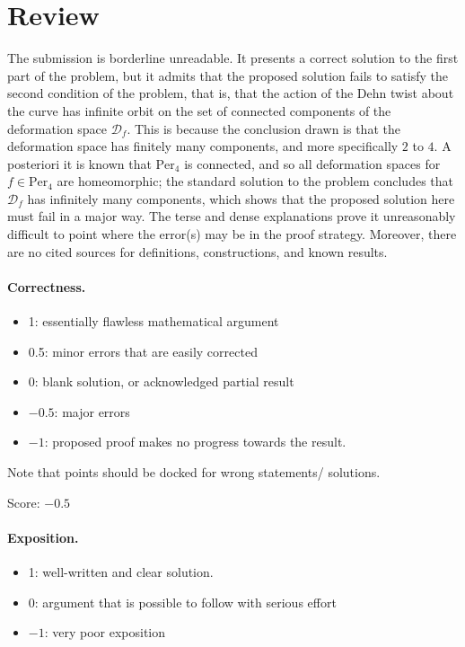 \documentclass[11pt]{article}
\theoremstyle{definition}
\theoremstyle{remark}
\begin{document}
\maketitle

\section{Review}
The submission is borderline unreadable. It presents a correct solution to the first part of the problem, but it admits that the proposed solution fails to satisfy the second condition of the problem, that is, that the action of the Dehn twist about the curve has infinite orbit on the set of connected components of the deformation space $\mathcal{D}_f$. This is because the conclusion drawn is that the deformation space has finitely many components, and more specifically $2$ to $4$. A posteriori it is known that $\mathrm{Per}_4$ is connected, and so all deformation spaces for $f \in \mathrm{Per}_4$ are homeomorphic; the standard solution to the problem concludes that $\mathcal{D}_f$ has infinitely many components, which shows that the proposed solution here must fail in a major way. The terse and dense explanations prove it unreasonably difficult to point where the error(s) may be in the proof strategy. Moreover, there are no cited sources for definitions, constructions, and known results.

\paragraph{Correctness.}
\begin{itemize}
	\item  1: essentially flawless mathematical argument
	\item  0.5: minor errors that are easily corrected
	\item  0: blank solution, or acknowledged partial result
	\item  $-0.5$: major errors
	\item  $-1$: proposed proof makes no progress towards the result.
\end{itemize}
Note that points should be docked for wrong statements/ solutions.

\noindent Score: $-0.5$

\paragraph{Exposition.}
\begin{itemize}
	\item  1: well-written and clear solution.
	\item  0: argument that is possible to follow with serious effort
	\item  $-1$: very poor exposition
\end{itemize}
\end{document}

